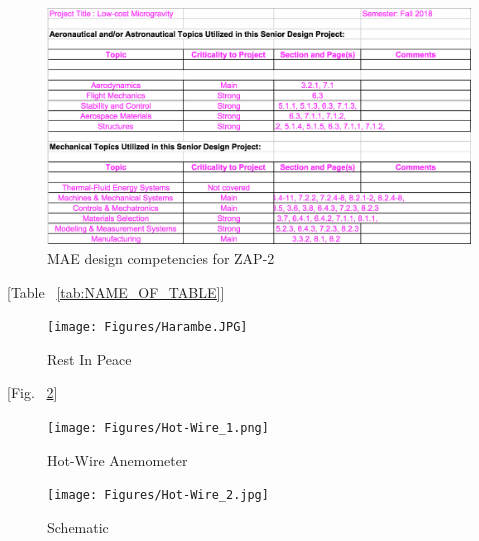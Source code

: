 \begin{figure}[ht]
  \centering
  \includegraphics[width=1\textwidth]{Figures/DesignCompetence.png}
  \caption{\label{fig:DesignComp}MAE design competencies for ZAP-2}
\end{figure}


\newpage





[Table ~\ref{tab:NAME_OF_TABLE}]

%
%
\begin{figure}[ht]
  \centering
  \texttt{[image: Figures/Harambe.JPG]}
  \caption{\label{fig:Harambe}Rest In Peace}
\end{figure}

[Fig. ~\ref{fig:Harambe}]

%
%
\begin{figure}[ht]
\centering
\begin{minipage}{.5\textwidth}
  \centering
  \texttt{[image: Figures/Hot-Wire\_1.png]}
  \caption{\label{fig:Hot_Wire_1}Hot-Wire Anemometer}
\end{minipage}%
\begin{minipage}{.5\textwidth}
  \centering
  \texttt{[image: Figures/Hot-Wire\_2.jpg]}
  \caption{\label{fig:Hot_Wire_2}Schematic}
\end{minipage}
\end{figure}

